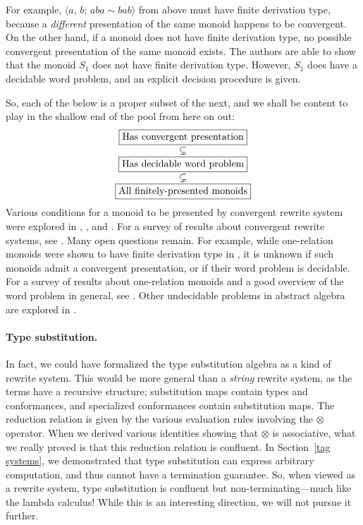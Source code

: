 \documentclass[../generics]{subfiles}
\begin{document}
For example, $\langle a,\,b;\,aba\sim bab\rangle$ from above must have finite derivation type, because a \emph{different} presentation of the same monoid happens to be convergent. On the other hand, if a monoid does not have finite derivation type, no possible convergent presentation of the same monoid exists. The authors are able to show that the monoid $S_1$ does not have finite derivation type. However, $S_1$ does have a decidable word problem, and an explicit decision procedure is given.

So, each of the below is a proper subset of the next, and we shall be content to play in the shallow end of the pool from here on out:
\[
\begin{array}{c}
\boxed{\hbox{Has convergent presentation}} \\
\subsetneq \\
\boxed{\hbox{Has decidable word problem}} \\
\subsetneq \\
\boxed{\hbox{All finitely-presented monoids}}
\end{array}
\]
Various conditions for a monoid to be presented by convergent rewrite system were explored in \cite{fptype}, \cite{fdtfp3}, and \cite{mild}. For a survey of results about convergent rewrite systems, see \cite{Otto1997}. Many open questions remain. For example, while one-relation monoids were shown to have finite derivation type in \cite{KOBAYASHI2000547}, it is unknown if such monoids admit a convergent presentation, or if their word problem is decidable. For a survey of results about one-relation monoids and a good overview of the word problem in general, see \cite{onerelation}. Other undecidable problems in abstract algebra are explored in \cite{tarski1953undecidable}.

\paragraph{Type substitution.} In fact, we could have formalized the type substitution algebra as a kind of rewrite system. This would be more general than a \emph{string} rewrite system, as the terms have a recursive structure; substitution maps contain types and conformances, and specialized conformances contain substitution maps. The reduction relation is given by the various evaluation rules involving the $\otimes$ operator. When we derived various identities showing that $\otimes$ is associative, what we really proved is that this reduction relation is confluent. In Section~\ref{tag systems}, we demonstrated that type substitution can express arbitrary computation, and thus cannot have a termination guarantee. So, when viewed as a rewrite system, type substitution is confluent but non-terminating---much like the lambda calculus! While this is an interesting direction, we will not pursue it further.
\end{document}
